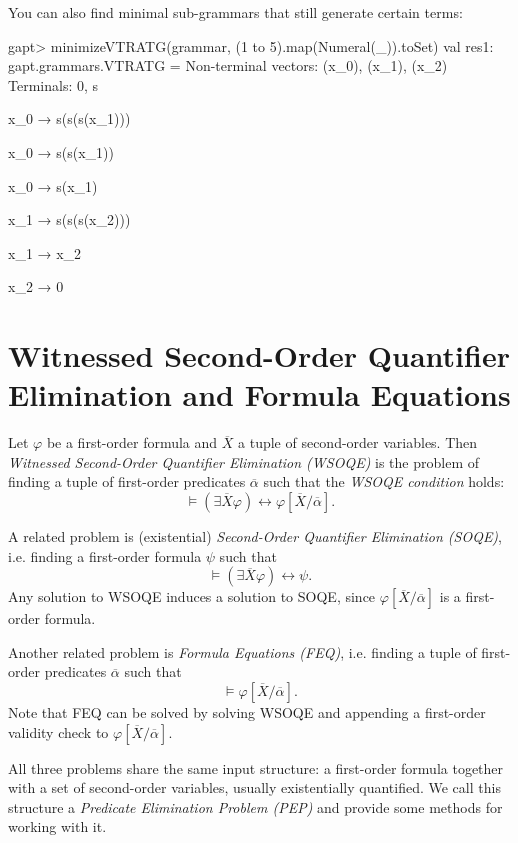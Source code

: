 \documentclass[a4paper,11pt]{book}
\begin{document}
You can also find minimal sub-grammars that still generate certain terms:
\begin{clilisting}
gapt> minimizeVTRATG(grammar, (1 to 5).map(Numeral(_)).toSet)
  val res1: gapt.grammars.VTRATG =
  Non-terminal vectors: (x_0), (x_1), (x_2)
  Terminals: 0, s

  x_0 → s(s(s(x_1)))

  x_0 → s(s(x_1))

  x_0 → s(x_1)

  x_1 → s(s(s(x_2)))

  x_1 → x_2

  x_2 → 0

\end{clilisting}

\section{Witnessed Second-Order Quantifier Elimination and Formula Equations}

Let $\varphi$ be a first-order formula and $\overline{X}$ a tuple of second-order variables.
Then \emph{Witnessed Second-Order Quantifier Elimination (WSOQE)} is the problem of finding a tuple of first-order predicates $\overline{\alpha}$ such that the \emph{WSOQE condition} holds:
\begin{equation}
  \label{eq:second-order-elimination-with-witness}
  \models (\exists \overline{X} \varphi) \leftrightarrow \varphi[\overline{X} / \overline{\alpha}].
\end{equation}

A related problem is (existential) \emph{Second-Order Quantifier Elimination (SOQE)}, i.e. finding a first-order formula $\psi$ such that
$$\models (\exists \overline{X} \varphi) \leftrightarrow \psi.$$
Any solution to WSOQE induces a solution to SOQE, since $\varphi[\overline{X} / \overline{\alpha}]$ is a first-order formula.

Another related problem is \emph{Formula Equations (FEQ)}, i.e. finding a tuple of first-order predicates $\overline{\alpha}$ such that
$$\models \varphi[\overline{X}/ \overline{\alpha}].$$
Note that FEQ can be solved by solving WSOQE and appending a first-order validity check to $\varphi[\overline{X} / \overline{\alpha}]$.

All three problems share the same input structure: a first-order formula together with a set of second-order variables, usually existentially quantified. We call this structure a \emph{Predicate Elimination Problem (PEP)} and provide some methods for working with it.
\end{document}
